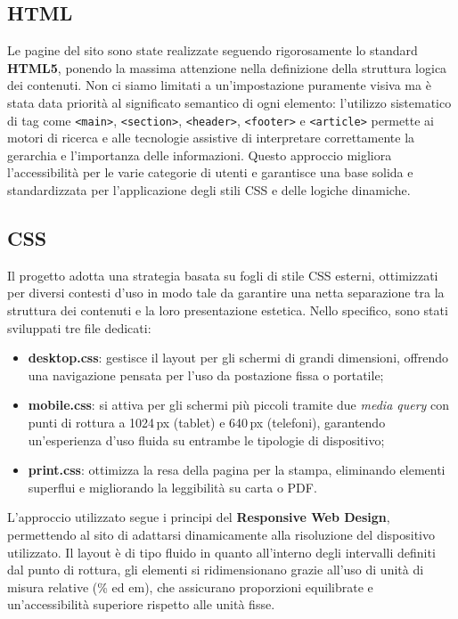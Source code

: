 \documentclass[11pt,a4paper]{article}
\begin{document}
\subsection{HTML}
Le pagine del sito sono state realizzate seguendo rigorosamente lo standard \textbf{HTML5}, ponendo la massima attenzione nella definizione della struttura logica dei contenuti. Non ci siamo limitati a un'impostazione puramente visiva ma \`e stata data priorit\`a al significato semantico di ogni elemento: l'utilizzo sistematico di tag come \texttt{<main>}, \texttt{<section>}, \texttt{<header>}, \texttt{<footer>} e \texttt{<article>} permette ai motori di ricerca e alle tecnologie assistive di interpretare correttamente la gerarchia e l'importanza delle informazioni. Questo approccio migliora l'accessibilit\`a per le varie categorie di utenti e garantisce una base solida e standardizzata per l'applicazione degli stili CSS e delle logiche dinamiche.

\subsection{CSS}
Il progetto adotta una strategia basata su fogli di stile CSS esterni, ottimizzati per diversi contesti d'uso in modo tale da garantire una netta separazione tra la struttura dei contenuti e la loro presentazione estetica. Nello specifico, sono stati sviluppati tre file dedicati:

\begin{itemize}
  \item \textbf{desktop.css}: gestisce il layout per gli schermi di grandi dimensioni, offrendo una navigazione pensata per l'uso da postazione fissa o portatile;
  \item \textbf{mobile.css}: si attiva per gli schermi pi\`u piccoli tramite due \textit{media query} con punti di rottura a 1024\,px (tablet) e 640\,px (telefoni), garantendo un'esperienza d'uso fluida su entrambe le tipologie di dispositivo;
  \item \textbf{print.css}: ottimizza la resa della pagina per la stampa, eliminando elementi superflui e migliorando la leggibilit\`a su carta o PDF.
\end{itemize}

L'approccio utilizzato segue i principi del \textbf{Responsive Web Design}, permettendo al sito di adattarsi dinamicamente alla risoluzione del dispositivo utilizzato. Il layout \`e di tipo fluido in quanto all'interno degli intervalli definiti dal punto di rottura, gli elementi si ridimensionano grazie all'uso di unit\`a di misura relative (\% ed em), che assicurano proporzioni equilibrate e un'accessibilit\`a superiore rispetto alle unit\`a fisse.
\end{document}

